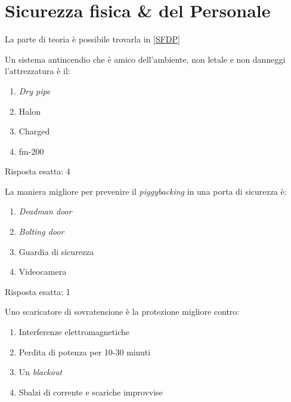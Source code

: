 \chapter{Sicurezza fisica \& del Personale}
\label{esSFDP}

La parte di teoria è possibile trovarla in \ref{SFDP}


\begin{Exercise} [
  title={Quiz},
  label={esSFDP1}
  ]

  \Question Un sistema antincendio che è amico dell'ambiente, non letale e non 
danneggi l'attrezzatura è il:
\begin{enumerate}
 \item \textit{Dry pipe}
 \item Halon
 \item Charged
 \item fm-200
\end{enumerate}

\end{Exercise}


\begin{Answer} [
  ref={esSFDP1},
  number={1}
  ]

  \Question Risposta esatta: 4

\end{Answer}


\begin{Exercise} [
  title={Quiz},
  label={esSFDP2}
  ]

  \Question La maniera migliore per prevenire il \textit{piggybacking} in una 
porta di sicurezza è:
\begin{enumerate}
 \item \textit{Deadman door}
 \item \textit{Bolting door}
 \item Guardia di sicurezza
 \item Videocamera
\end{enumerate}

\end{Exercise}


\begin{Answer} [
  ref={esSFDP2},
  number={2}
  ]

  \Question Risposta esatta: 1

\end{Answer}


\begin{Exercise} [
  title={Quiz},
  label={esSFDP3}
  ]

  \Question Uno scaricatore di sovratensione è la protezione migliore contro:
  \begin{enumerate}
   \item Interferenze elettromagnetiche
   \item Perdita di potenza per 10-30 minuti
   \item Un \textit{blackout}
   \item Sbalzi di corrente e scariche improvvise
  \end{enumerate}
  
\end{Exercise}


